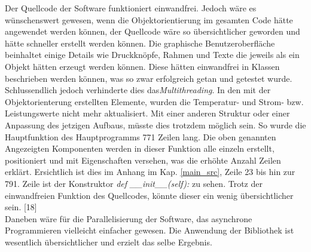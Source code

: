 

Der Quellcode der Software funktioniert einwandfrei. Jedoch wäre es wünschenswert gewesen, wenn die Objektorientierung im gesamten Code hätte angewendet werden können, der Quellcode wäre so übersichtlicher geworden und hätte schneller erstellt werden können. Die graphische Benutzeroberfläche beinhaltet einige Details wie Druckknöpfe, Rahmen und Texte die jeweils als ein Objekt hätten erzeugt werden können. Diese hätten einwandfrei in Klassen beschrieben werden können, was so zwar erfolgreich getan und getestet wurde. Schlussendlich jedoch verhinderte dies das\textit{Multithreading}. In den mit der Objektorienterung erstellten Elemente, wurden die Temperatur- und Strom- bzw. Leistungswerte nicht mehr aktualisiert. Mit einer anderen Struktur oder einer Anpassung des jetzigen Aufbaus, müsste dies trotzdem möglich sein. So wurde die Hauptfunktion des Hauptprogramms 771 Zeilen lang. Die oben genannten Angezeigten Komponenten werden in dieser Funktion alle einzeln erstellt, positioniert und mit Eigenschaften versehen, was die erhöhte Anzahl Zeilen erklärt. Ersichtlich ist dies im Anhang im Kap. \ref{main_src}, Zeile 23 bis hin zur 791. Zeile ist der Konstruktor \textit{def \_\_init\_\_(self):} zu sehen. Trotz der einwandfreien Funktion des Quellcodes, könnte dieser ein wenig übersichtlicher sein. [18]\\

Daneben wäre für die Parallelisierung der Software, das asynchrone Programmieren vielleicht einfacher gewesen. Die Anwendung der Bibliothek ist wesentlich übersichtlicher und erzielt das selbe Ergebnis.\\



